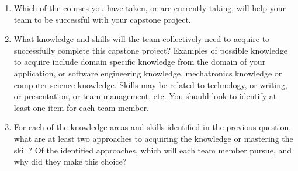 \documentclass[12pt]{article}
\begin{document}
\begin{enumerate}
  \item Which of the courses you have taken, or are currently taking, will help
  your team to be successful with your capstone project. 
  \item What knowledge and skills will the team collectively need to acquire to
  successfully complete this capstone project?  Examples of possible knowledge
  to acquire include domain specific knowledge from the domain of your
  application, or software engineering knowledge, mechatronics knowledge or
  computer science knowledge.  Skills may be related to technology, or writing,
  or presentation, or team management, etc.  You should look to identify at
  least one item for each team member.
  \item For each of the knowledge areas and skills identified in the previous
  question, what are at least two approaches to acquiring the knowledge or
  mastering the skill?  Of the identified approaches, which will each team
  member pursue, and why did they make this choice?
\end{enumerate}
\end{document}
